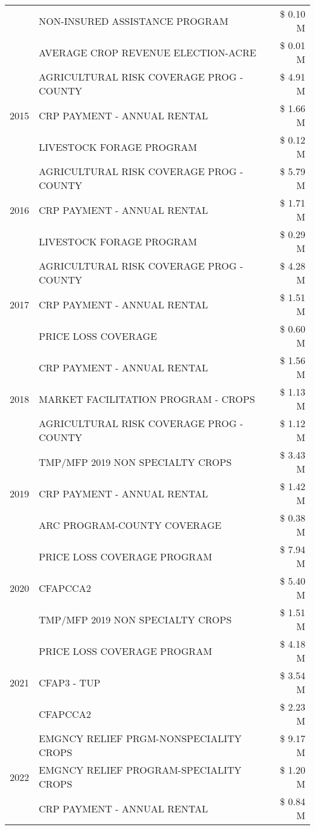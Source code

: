 \begin{tabular}{llr}
 & NON-INSURED ASSISTANCE PROGRAM & \$ 0.10 M \\
 & AVERAGE CROP REVENUE ELECTION-ACRE & \$ 0.01 M \\
\cline{1-3}
\multirow[t]{3}{*}{2015} & AGRICULTURAL RISK COVERAGE PROG - COUNTY & \$ 4.91 M \\
 & CRP PAYMENT - ANNUAL RENTAL & \$ 1.66 M \\
 & LIVESTOCK FORAGE PROGRAM & \$ 0.12 M \\
\cline{1-3}
\multirow[t]{3}{*}{2016} & AGRICULTURAL RISK COVERAGE PROG - COUNTY & \$ 5.79 M \\
 & CRP PAYMENT - ANNUAL RENTAL & \$ 1.71 M \\
 & LIVESTOCK FORAGE PROGRAM & \$ 0.29 M \\
\cline{1-3}
\multirow[t]{3}{*}{2017} & AGRICULTURAL RISK COVERAGE PROG - COUNTY & \$ 4.28 M \\
 & CRP PAYMENT - ANNUAL RENTAL & \$ 1.51 M \\
 & PRICE LOSS COVERAGE & \$ 0.60 M \\
\cline{1-3}
\multirow[t]{3}{*}{2018} & CRP PAYMENT - ANNUAL RENTAL & \$ 1.56 M \\
 & MARKET FACILITATION PROGRAM - CROPS & \$ 1.13 M \\
 & AGRICULTURAL RISK COVERAGE PROG - COUNTY & \$ 1.12 M \\
\cline{1-3}
\multirow[t]{3}{*}{2019} & TMP/MFP 2019 NON SPECIALTY CROPS & \$ 3.43 M \\
 & CRP PAYMENT - ANNUAL RENTAL & \$ 1.42 M \\
 & ARC PROGRAM-COUNTY COVERAGE & \$ 0.38 M \\
\cline{1-3}
\multirow[t]{3}{*}{2020} & PRICE LOSS COVERAGE PROGRAM & \$ 7.94 M \\
 & CFAPCCA2 & \$ 5.40 M \\
 & TMP/MFP 2019 NON SPECIALTY CROPS & \$ 1.51 M \\
\cline{1-3}
\multirow[t]{3}{*}{2021} & PRICE LOSS COVERAGE PROGRAM & \$ 4.18 M \\
 & CFAP3 - TUP & \$ 3.54 M \\
 & CFAPCCA2 & \$ 2.23 M \\
\cline{1-3}
\multirow[t]{3}{*}{2022} & EMGNCY RELIEF PRGM-NONSPECIALITY CROPS & \$ 9.17 M \\
 & EMGNCY RELIEF PROGRAM-SPECIALITY CROPS & \$ 1.20 M \\
 & CRP PAYMENT - ANNUAL RENTAL & \$ 0.84 M \\
\cline{1-3}
\bottomrule
\end{tabular}
